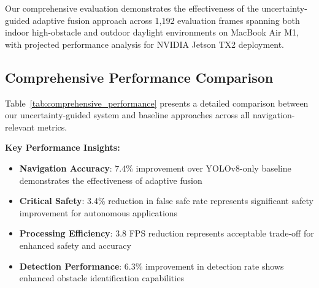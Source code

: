 \documentclass[10pt]{article}
\newcommand{\tabref}[1]{Table~\ref{#1}}
\begin{document}
Our comprehensive evaluation demonstrates the effectiveness of the uncertainty-guided adaptive fusion approach across 1,192 evaluation frames spanning both indoor high-obstacle and outdoor daylight environments on MacBook Air M1, with projected performance analysis for NVIDIA Jetson TX2 deployment.

\subsection{Comprehensive Performance Comparison}

\tabref{tab:comprehensive_performance} presents a detailed comparison between our uncertainty-guided system and baseline approaches across all navigation-relevant metrics.

\begin{table}[ht]
\centering
\caption{Comprehensive Performance Comparison: Uncertainty-Guided System vs Baselines}
\label{tab:comprehensive_performance}
\end{table}

\textbf{Key Performance Insights:}

\begin{itemize}
\item \textbf{Navigation Accuracy}: 7.4\% improvement over YOLOv8-only baseline demonstrates the effectiveness of adaptive fusion
\item \textbf{Critical Safety}: 3.4\% reduction in false safe rate represents significant safety improvement for autonomous applications
\item \textbf{Processing Efficiency}: 3.8 FPS reduction represents acceptable trade-off for enhanced safety and accuracy
\item \textbf{Detection Performance}: 6.3\% improvement in detection rate shows enhanced obstacle identification capabilities
\end{itemize}
\end{document}
